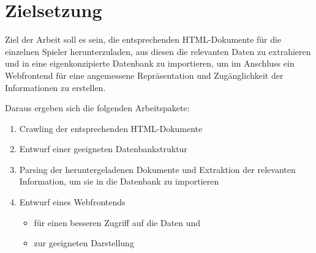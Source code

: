 \section{Zielsetzung}
Ziel der Arbeit soll es sein, die entsprechenden HTML-Dokumente für die einzelnen Spieler herunterzuladen, aus diesen die relevanten Daten zu extrahieren und in eine eigenkonzipierte Datenbank zu importieren, um im Anschluss ein Webfrontend für eine angemessene Repräsentation und Zugänglichkeit der Informationen zu erstellen.

Daraus ergeben sich die folgenden Arbeitspakete:
\begin{enumerate}
\item Crawling der entsprechenden HTML-Dokumente
\item Entwurf einer geeigneten Datenbankstruktur
\item Parsing der heruntergeladenen Dokumente und Extraktion der relevanten Information, um sie in die Datenbank zu importieren
\item Entwurf eines Webfrontends
	\begin{itemize}
	\item für einen besseren Zugriff auf die Daten und
	\item zur geeigneten Darstellung
	\end{itemize}
\end{enumerate}
